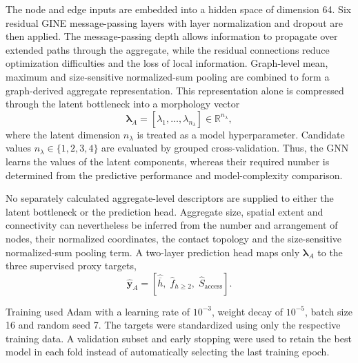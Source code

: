 \documentclass[12pt,a4paper]{article}
\begin{document}
The node and edge inputs are embedded into a hidden space of dimension 64.
Six residual GINE message-passing layers with layer normalization and dropout
are then applied. The message-passing depth allows information to propagate
over extended paths through the aggregate, while the residual connections
reduce optimization difficulties and the loss of local information. Graph-level
mean, maximum and size-sensitive normalized-sum pooling are combined to form a
graph-derived aggregate representation. This representation alone is
compressed through the latent bottleneck into a morphology vector
\begin{equation}
	\boldsymbol{\lambda}_A =
	\left[\lambda_1,\ldots,\lambda_{n_\lambda}\right]
	\in \mathbb{R}^{n_\lambda},
\end{equation}
where the latent dimension $n_\lambda$ is treated as a model hyperparameter.
Candidate values $n_\lambda\in\{1,2,3,4\}$ are evaluated by grouped
cross-validation. Thus, the GNN learns the values of the latent components,
whereas their required number is determined from the predictive performance
and model-complexity comparison.

No separately calculated aggregate-level descriptors are supplied to either
the latent bottleneck or the prediction head. Aggregate size, spatial extent
and connectivity can nevertheless be inferred from the number and arrangement
of nodes, their normalized coordinates, the contact topology and the
size-sensitive normalized-sum pooling term. A two-layer prediction head maps
only $\boldsymbol{\lambda}_A$ to the three supervised proxy targets,
\begin{equation}
	\widehat{\boldsymbol{y}}_A =
	\left[
	\widehat{\overline{h}},\;
	\widehat{f}_{h\geq2},\;
	\widehat{S}_{\mathrm{access}}
	\right].
\end{equation}

Training used Adam with a learning rate of $10^{-3}$, weight decay of $10^{-5}$,
batch size 16 and random seed 7. The targets were standardized using only the
respective training data. A validation subset and early stopping were used to
retain the best model in each fold instead of automatically selecting the last
training epoch.
\end{document}
